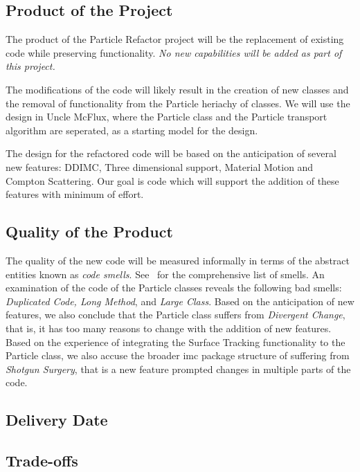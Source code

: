 \documentclass[11pt]{nmemo}
\begin{document}
\subsection*{Product of the Project}

The product of the Particle Refactor project will be the replacement
of existing code while preserving functionality. {\em No new
  capabilities will be added as part of this project.}

The modifications of the code will likely result in the creation of
new classes and the removal of functionality from the Particle
heriachy of classes. We will use the design in Uncle McFlux, where the
Particle class and the Particle transport algorithm are seperated, as
a starting model for the design.

The design for the refactored code will be based on the anticipation
of several new features: DDIMC, Three dimensional support, Material
Motion and Compton Scattering. Our goal is code which will support the
addition of these features with minimum of effort.

\subsection*{Quality of the Product}

The quality of the new code will be measured informally in terms of
the abstract entities known as {\em code smells}. See~\cite[Chapter
3]{fowler00} for the comprehensive list of smells. An examination of
the code of the Particle classes reveals the following bad smells:
{\em Duplicated Code, Long Method}, and {\em Large Class}.  Based on
the anticipation of new features, we also conclude that the Particle
class suffers from {\em Divergent Change}, that is, it has too many
reasons to change with the addition of new features. Based on the
experience of integrating the Surface Tracking functionality to the
Particle class, we also accuse the broader imc package structure of
suffering from {\em Shotgun Surgery}, that is a new feature prompted
changes in multiple parts of the code.

\subsection*{Delivery Date}

\subsection*{Trade-offs}
\end{document}
